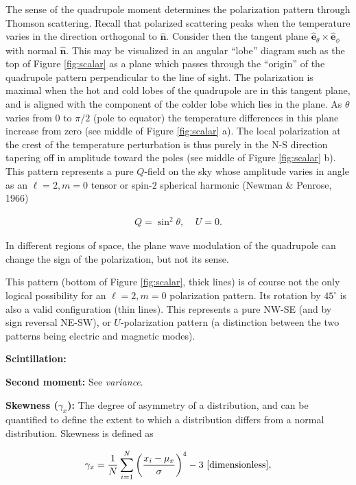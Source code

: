 \documentclass[a4paper,10pt]{article}
\begin{document}
{\noindent}The sense of the quadrupole moment determines the polarization pattern through Thomson scattering. Recall that polarized scattering peaks when the temperature varies in the direction orthogonal to $\bm{\hat{n}}$. Consider then the tangent plane $\bm{\hat{e}}_\theta\times\bm{\hat{e}}_\phi$ with normal $\bm{\hat{n}}$. This may be visualized in an angular ``lobe'' diagram such as the top of Figure \ref{fig:scalar} as a plane which passes through the ``origin'' of the quadrupole pattern perpendicular to the line of sight. The polarization is maximal when the hot and cold lobes of the quadrupole are in this tangent plane, and is aligned with the component of the colder lobe which lies in the plane. As $\theta$ varies from $0$ to $\pi/2$ (pole to equator) the temperature differences in this plane increase from zero (see middle of Figure \ref{fig:scalar} a). The local polarization at the crest of the temperature perturbation is thus purely in the N-S direction tapering off in amplitude toward the poles (see middle of Figure \ref{fig:scalar} b). This pattern represents a pure $Q$-field on the sky whose amplitude varies in angle as an $\ell=2,m=0$ tensor or spin-$2$ spherical harmonic (Newman \& Penrose, 1966)

\begin{align*}
    Q=\sin^2\theta,~~~~~U=0.
\end{align*}

{\noindent}In different regions of space, the plane wave modulation of the quadrupole can change the sign of the polarization, but not its sense.

{\noindent}This pattern (bottom of Figure \ref{fig:scalar}, thick lines) is of course not the only logical possibility for an $\ell=2,m=0$ polarization pattern. Its rotation by $45^\circ$ is also a valid configuration (thin lines). This represents a pure NW-SE (and by sign reversal NE-SW), or $U$-polarization pattern (a distinction between the two patterns being electric and magnetic modes).

{\noindent}\textbf{Scintillation:}

{\noindent}\textbf{Second moment:} See \textit{variance}.

{\noindent}\textbf{Skewness ($\gamma_x$):} The degree of asymmetry of a distribution, and can be quantified to define the extent to which a distribution differs from a normal distribution. Skewness is defined as

\begin{align*}
    \gamma_x = \frac{1}{N} \sum_{i=1}^N \left(\frac{x_i-\mu_x}{\sigma}\right)^4 -3 ~ [{\rm dimensionless}],
\end{align*}
\end{document}
